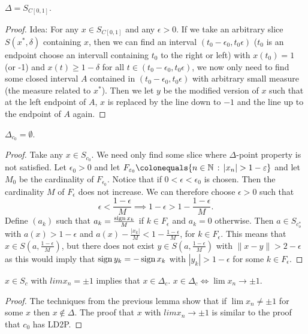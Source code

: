 \documentclass{article}
\begin{document}

\begin{lem}
$\Delta = S_{C[0,1]}$.
\end{lem}
\begin{proof}
Idea:  For any $x\in S_{C[0,1]}$ and any $\epsilon >0$. If we take an arbitrary slice $S( x^*, \delta)$ containing $x$, then we can find an interval $(t_0-\epsilon_0, t_0\epsilon)$ ($t_0$ is an endpoint choose an intervall containing $t_0$ to the right or left) with $x(t_0) = 1$ (or -1) and $x(t)\geq 1-\delta$ for all $t\in (t_0-\epsilon_0, t_0\epsilon)$, we now only need to find some closed interval $A$ contained in $(t_0-\epsilon_0, t_0\epsilon)$ with arbitrary small measure (the measure related to $x^*$). Then we let $y$ be the modified version of $x$ such that at the left endpoint of $A$, $x$ is replaced by the line down to $-1$ and the line up to the endpoint of $A$ again.  
\end{proof}


\begin{lem}
$\Delta_{c_0} = \emptyset$.
\end{lem}

\begin{proof}
Take any $x\in S_{c_0}$. We need only find some slice where $\Delta$-point property is not satisfied. Let $\epsilon_0>0$ and let $F_{\epsilon_0} \colonequals \{n\in \N \,:\, |x_n|> 1-\epsilon\}$ and let $M_0$ be the cardinality of $F_{\epsilon_0}$. Notice that if $0<\epsilon<\epsilon_0$ is chosen. Then the cardinality $M$ of $F_\epsilon$ does not increase. We can therefore choose $\epsilon>0$ such that 
\[ 
\epsilon < \frac{1-\epsilon}{M} \implies 1-\epsilon > 1- \frac{1-\epsilon}{M}.
\]
Define $(a_k)$ such that $a_k = \frac{\operatorname{sign} x_k}{M}$ if $k\in F_\epsilon$ and $a_k=0$ otherwise. Then $a \in S_{c_o^*}$ with $a(x)> 1-\epsilon$ and $a(x)- \frac{|x_k|}{M} < 1 - \frac{1-\epsilon}{M}$, for $k\in F_\epsilon$. This means that $x\in S(a, \frac{1-\epsilon}{M})$, but there does not exist $y\in S(a, \frac{1-\epsilon}{M})$ with $\|x-y\|>2-\epsilon$ as this would imply that $\operatorname{sign} y_k = - \operatorname{sign} x_k$ with $|y_k| > 1-\epsilon$ for some $k\in F_\epsilon$. 
\end{proof}





\begin{lem}
$x\in S_c$ with $lim x_n = \pm 1$ implies that $x\in \Delta_c$. $x\in \Delta_c \iff \lim x_n \rightarrow \pm 1$. 
\end{lem}


\begin{proof}
The techniques from the previous lemma show that if $\lim x_n \neq \pm 1$ for some $x$ then $x\notin \Delta$. The proof that $x$ with $lim x_n \rightarrow \pm 1$ is similar to the proof that $c_0$ has LD2P.
\end{proof}



\end{document}
